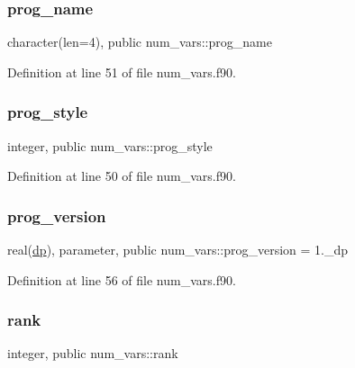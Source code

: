 \subsubsection{\texorpdfstring{prog\+\_\+name}{prog\_name}}
{\footnotesize\ttfamily character(len=4), public num\+\_\+vars\+::prog\+\_\+name}



Definition at line 51 of file num\+\_\+vars.\+f90.

\mbox{\label{namespacenum__vars_a50245a345efb453eda46b3fe98b702e8}} 
\subsubsection{\texorpdfstring{prog\+\_\+style}{prog\_style}}
{\footnotesize\ttfamily integer, public num\+\_\+vars\+::prog\+\_\+style}



Definition at line 50 of file num\+\_\+vars.\+f90.

\mbox{\label{namespacenum__vars_a7ab03bffd054a230cad4b7e2c130def1}} 
\subsubsection{\texorpdfstring{prog\+\_\+version}{prog\_version}}
{\footnotesize\ttfamily real(\hyperlink{namespacenum__vars_a03802aa2bd86439d7a9370836fabf3f2}{dp}), parameter, public num\+\_\+vars\+::prog\+\_\+version = 1.\+\_\+dp}



Definition at line 56 of file num\+\_\+vars.\+f90.

\mbox{\label{namespacenum__vars_ab47aa91445feaedb05ac9d1a584664fe}} 
\subsubsection{\texorpdfstring{rank}{rank}}
{\footnotesize\ttfamily integer, public num\+\_\+vars\+::rank}



